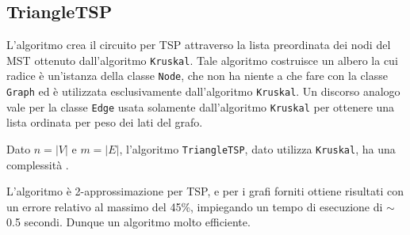 \subsection{TriangleTSP}

L'algoritmo crea il circuito per TSP attraverso la lista preordinata dei nodi del MST ottenuto dall'algoritmo \texttt{Kruskal}. Tale algoritmo costruisce un albero la cui radice è un'istanza della classe \texttt{Node}, che non ha niente a che fare con la classe \texttt{Graph} ed è utilizzata esclusivamente dall'algoritmo \texttt{Kruskal}. Un discorso analogo vale per la classe \texttt{Edge} usata solamente dall'algoritmo \texttt{Kruskal} per ottenere una lista ordinata per peso dei lati del grafo.\acapo

Dato $n=|V|$ e $m=|E|$, l'algoritmo \texttt{TriangleTSP}, dato utilizza \texttt{Kruskal}, ha una complessità .\acapo

L'algoritmo è 2-approssimazione per TSP, e per i grafi forniti ottiene risultati con un errore relativo al massimo del 45\%, impiegando un tempo di esecuzione di $\sim$0.5 secondi. Dunque un algoritmo molto efficiente.

